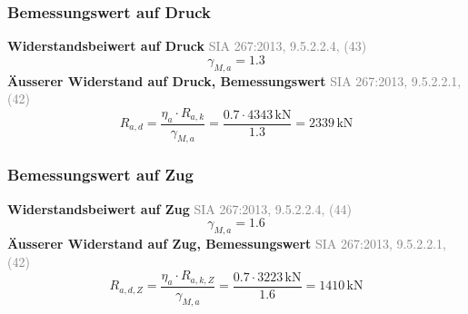\documentclass[11pt,a4paper]{article}
\newcommand{\normref}[1]{{\small\textcolor{gray}{#1}}}
\begin{document}
\subsubsection{Bemessungswert auf Druck}
\noindent\textbf{Widerstandsbeiwert auf Druck} \hfill \normref{SIA 267:2013, 9.5.2.2.4, (43)}
\begin{equation*}
\gamma_{M,a} = 1.3
\end{equation*}
\noindent\textbf{Äusserer Widerstand auf Druck, Bemessungswert} \hfill \normref{SIA 267:2013, 9.5.2.2.1, (42)}
\begin{equation*}
R_{a,d} = \frac{\eta_a \cdot R_{a,k}}{\gamma_{M,a}} = \frac{0.7 \cdot 4343\,\mathrm{kN}}{1.3} = 2339\,\mathrm{kN}
\end{equation*}
\subsubsection{Bemessungswert auf Zug}
\noindent\textbf{Widerstandsbeiwert auf Zug} \hfill \normref{SIA 267:2013, 9.5.2.2.4, (44)}
\begin{equation*}
\gamma_{M,a} = 1.6
\end{equation*}
\noindent\textbf{Äusserer Widerstand auf Zug, Bemessungswert} \hfill \normref{SIA 267:2013, 9.5.2.2.1, (42)}
\begin{equation*}
R_{a,d,Z} = \frac{\eta_a \cdot R_{a,k,Z}}{\gamma_{M,a}} = \frac{0.7 \cdot 3223\,\mathrm{kN}}{1.6} = 1410\,\mathrm{kN}
\end{equation*}
\end{document}
